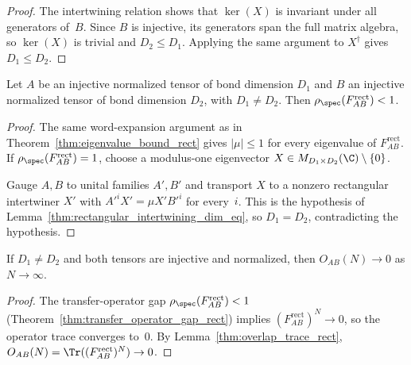 \begin{proof}\leanok
    The intertwining relation shows that $\ker(X)$ is invariant under
    all generators of~$B$.
    Since $B$ is injective, its generators span the full matrix algebra,
    so $\ker(X)$ is trivial and $D_2 \le D_1$.
    Applying the same argument to $X^\dagger$ gives $D_1 \le D_2$.
\end{proof}

\begin{theorem}\label{thm:transfer_operator_gap_rect}
    \leanok
    Let $A$ be an injective normalized tensor of bond dimension
    $D_1$ and $B$ an injective normalized tensor of bond
    dimension $D_2$, with $D_1 \neq D_2$.
    Then $\rho_{\spec}(F_{AB}^{\mathrm{rect}}) < 1$.
\end{theorem}

\begin{proof}
    \leanok
    The same word-expansion argument as in
    Theorem~\ref{thm:eigenvalue_bound_rect} gives $|\mu| \le 1$
    for every eigenvalue of $F_{AB}^{\mathrm{rect}}$.
    If $\rho_{\spec}(F_{AB}^{\mathrm{rect}}) = 1$, choose a
    modulus-one eigenvector $X \in M_{D_1 \times D_2}(\C) \setminus \{0\}$.

    Gauge $A,B$ to unital families $A',B'$ and transport $X$ to a nonzero
    rectangular intertwiner $X'$ with $A'^i X' = \mu X' B'^i$ for every~$i$.
    This is the hypothesis of
    Lemma~\ref{thm:rectangular_intertwining_dim_eq}, so $D_1 = D_2$,
    contradicting the hypothesis.
\end{proof}

\begin{theorem}\label{thm:overlap_decay_rect}
    \leanok
    If $D_1 \neq D_2$ and both tensors are injective and
    normalized, then $O_{AB}(N) \to 0$ as $N \to \infty$.
\end{theorem}

\begin{proof}\leanok{}
    The transfer-operator gap $\rho_{\spec}(F_{AB}^{\mathrm{rect}}) < 1$
    (Theorem~\ref{thm:transfer_operator_gap_rect}) implies
    $(F_{AB}^{\mathrm{rect}})^N \to 0$, so the operator
    trace converges to~$0$.
    By Lemma~\ref{thm:overlap_trace_rect},
    $O_{AB}(N) = \Tr((F_{AB}^{\mathrm{rect}})^N) \to 0$.
\end{proof}

